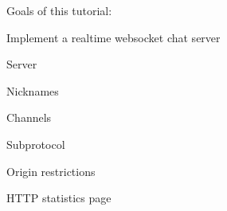 Goals of this tutorial\+:
\begin{DoxyItemize}
\item Implement a realtime websocket chat server
\end{DoxyItemize}

Server
\begin{DoxyItemize}
\item Nicknames
\item Channels
\item Subprotocol
\item Origin restrictions
\item H\+T\+TP statistics page 
\end{DoxyItemize}